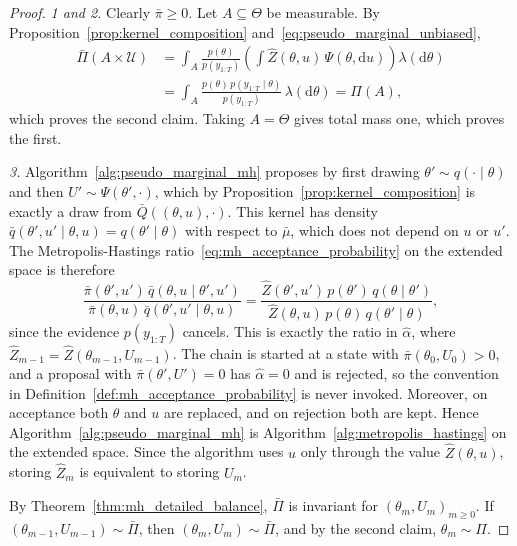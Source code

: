 \begin{proof}
    \emph{1 and 2.} Clearly $\bar{\pi}\ge0$. Let $A\subseteq\Theta$ be measurable. By Proposition~\ref{prop:kernel_composition} and~\eqref{eq:pseudo_marginal_unbiased},
    \begin{align}
        \bar{\Pi}(A\times\mathcal{U}) &= \int_A\frac{p(\theta)}{p(y_{1:T})}\left(\int\hat{Z}(\theta,u)\,\Psi(\theta,\mathrm{d}u)\right)\lambda(\mathrm{d}\theta) \\
        &= \int_A\frac{p(\theta)\,p(y_{1:T}\mid\theta)}{p(y_{1:T})}\,\lambda(\mathrm{d}\theta) = \Pi(A),
    \end{align}
    which proves the second claim. Taking $A = \Theta$ gives total mass one, which proves the first.

    \emph{3.} Algorithm~\ref{alg:pseudo_marginal_mh} proposes by first drawing $\theta'\sim q(\cdot\mid\theta)$ and then $U'\sim\Psi(\theta',\cdot)$, which by Proposition~\ref{prop:kernel_composition} is exactly a draw from $\bar{Q}((\theta,u),\cdot)$. This kernel has density $\bar{q}(\theta',u'\mid\theta,u) = q(\theta'\mid\theta)$ with respect to $\bar{\mu}$, which does not depend on $u$ or $u'$. The Metropolis-Hastings ratio~\eqref{eq:mh_acceptance_probability} on the extended space is therefore
    \begin{equation}
        \frac{\bar{\pi}(\theta',u')\,\bar{q}(\theta,u\mid\theta',u')}{\bar{\pi}(\theta,u)\,\bar{q}(\theta',u'\mid\theta,u)} = \frac{\hat{Z}(\theta',u')\,p(\theta')\,q(\theta\mid\theta')}{\hat{Z}(\theta,u)\,p(\theta)\,q(\theta'\mid\theta)},
    \end{equation}
    since the evidence $p(y_{1:T})$ cancels. This is exactly the ratio in $\hat{\alpha}$, where $\hat{Z}_{m-1} = \hat{Z}(\theta_{m-1},U_{m-1})$. The chain is started at a state with $\bar{\pi}(\theta_0,U_0)>0$, and a proposal with $\bar{\pi}(\theta',U') = 0$ has $\hat{\alpha} = 0$ and is rejected, so the convention in Definition~\ref{def:mh_acceptance_probability} is never invoked. Moreover, on acceptance both $\theta$ and $u$ are replaced, and on rejection both are kept. Hence Algorithm~\ref{alg:pseudo_marginal_mh} is Algorithm~\ref{alg:metropolis_hastings} on the extended space. Since the algorithm uses $u$ only through the value $\hat{Z}(\theta,u)$, storing $\hat{Z}_m$ is equivalent to storing $U_m$.

    By Theorem~\ref{thm:mh_detailed_balance}, $\bar{\Pi}$ is invariant for $(\theta_m,U_m)_{m\ge0}$. If $(\theta_{m-1},U_{m-1})\sim\bar{\Pi}$, then $(\theta_m,U_m)\sim\bar{\Pi}$, and by the second claim, $\theta_m\sim\Pi$.
\end{proof}

